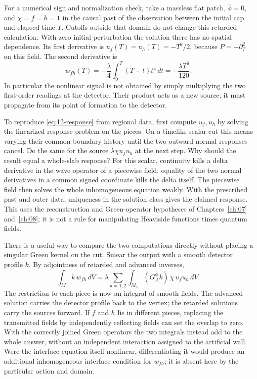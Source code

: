 For a numerical sign and normalization check, take a massless flat patch,
$\bar\phi=0$, and $\chi=f=h=1$ in the causal past of the observation
between the initial cap and elapsed time $T$. Cutoffs outside that domain
do not change this retarded calculation. With zero initial perturbation
the solution there has no spatial dependence. Its first derivative is
$u_f(T)=u_h(T)=-T^2/2$, because $P=-\partial_T^2$ on this field. The
second derivative is
\[
 w_{fh}(T)=-\frac{\lambda}{4}\int_0^T(T-t)t^4\,dt
          =-\frac{\lambda T^6}{120} .
\]
In particular the nonlinear signal is not obtained by simply multiplying
the two first-order readings at the detector. Their product acts as a new
source; it must propagate from its point of formation to the detector.

To reproduce \eqref{eq:12-response} from regional data, first compute
$u_f,u_h$ by solving the linearized response problem on the pieces. On a
timelike scalar cut this means varying their common boundary history until
the two outward normal responses cancel. Do the same for the source
$\lambda\chi u_f u_h$ at the next step. Why should the result equal a
whole-slab response? For this scalar, continuity kills a delta derivative
in the wave operator of a piecewise field; equality of the two normal
derivatives in a common signed coordinate kills the delta itself. The
piecewise field then solves the whole inhomogeneous equation weakly. With
the prescribed past and outer data, uniqueness in the solution class gives
the claimed response. This uses the reconstruction and Green-operator
hypotheses of Chapters~\ref{ch:07} and~\ref{ch:08}; it is not a rule for
manipulating Heaviside functions times quantum fields.

There is a useful way to compare the two computations directly without
placing a singular Green kernel on the cut. Smear the output with a smooth
detector profile $k$. By adjointness of retarded and advanced inverses,
\begin{equation}
 \int_M k\,w_{fh}\,dV
 =\lambda\sum_{a=1,2}\int_{M_a}
 (G_A^{\bar\phi}k)\,\chi\,u_f u_h\,dV .
 \label{eq:12-sewn-tree}
\end{equation}
The restriction to each piece is now an integral of smooth fields. The
advanced solution carries the detector profile back to the vertex; the
retarded solutions carry the sources forward. If $f$ and $h$ lie in
different pieces, replacing the transmitted fields by independently
reflecting fields can set the overlap to zero. With the correctly joined
Green operators the two integrals instead add to the whole answer, without
an independent interaction assigned to the artificial wall. Were the
interface equation itself nonlinear, differentiating it would produce an
additional inhomogeneous interface condition for $w_{fh}$; it is absent
here by the particular action and domain.

